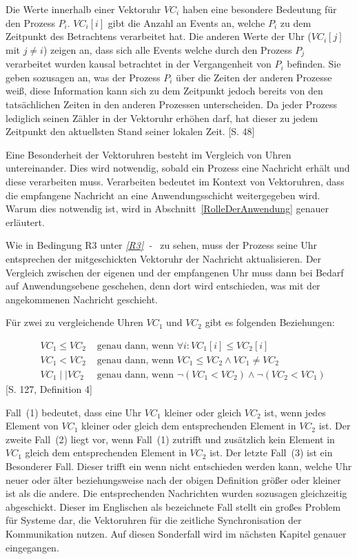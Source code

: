 Die Werte innerhalb einer Vektoruhr $VC_i$ haben eine besondere Bedeutung für den Prozess $P_i$. $VC_i[i]$ gibt die Anzahl an Events an, welche $P_i$ zu dem Zeitpunkt des Betrachtens verarbeitet hat. Die anderen Werte der Uhr ($VC_i[j]$ mit $j \neq i$) zeigen an, dass sich alle Events welche durch den Prozess $P_j$ verarbeitet wurden kausal betrachtet in der Vergangenheit von $P_i$ befinden. Sie geben sozusagen an, was der Prozess $P_i$ über die Zeiten der anderen Prozesse weiß, diese Information kann sich zu dem Zeitpunkt jedoch bereits von den tatsächlichen Zeiten in den anderen Prozessen unterscheiden. Da jeder Prozess lediglich seinen Zähler in der Vektoruhr erhöhen darf, hat dieser zu jedem Zeitpunkt den aktuellsten Stand seiner lokalen Zeit. \cite{singhal1992efficient}[S. 48]

Eine Besonderheit der Vektoruhren besteht im Vergleich von Uhren untereinander. Dies wird notwendig, sobald ein Prozess eine Nachricht erhält und diese verarbeiten muss. Verarbeiten bedeutet im Kontext von Vektoruhren, dass die empfangene Nachricht an eine Anwendungsschicht weitergegeben wird. Warum dies notwendig ist, wird in Abschnitt~\ref{RolleDerAnwendung} genauer erläutert.

Wie in Bedingung R3 unter \textit{\ref{R3}~-~} zu sehen, muss der Prozess seine Uhr entsprechen der mitgeschickten Vektoruhr der Nachricht aktualisieren. Der Vergleich zwischen der eigenen und der empfangenen Uhr muss dann bei Bedarf auf Anwendungsebene geschehen, denn dort wird entschieden, was mit der angekommenen Nachricht geschieht.

Für zwei zu vergleichende Uhren $VC_1$ und $VC_2$ gibt es folgenden Beziehungen:

\begin{eqnarray}
&VC_1 \leq VC_2& \text{ genau dann, wenn } \forall i : VC_1[i] \leq VC_2[i] \\
	&VC_1 < VC_2& \text{ genau dann, wenn } VC_1 \leq VC_2 \wedge VC_1 \neq VC_2 \\
	&VC_1 \mid \mid VC_2& \text{ genau dann, wenn } \neg(VC_1 < VC_2) \wedge \neg(VC_2 < VC_1)
\end{eqnarray}
\cite{mattern1989virtual}[S. 127, Definition 4]

Fall~(1) bedeutet, dass eine Uhr $VC_1$ kleiner oder gleich $VC_2$ ist, wenn jedes Element von $VC_1$ kleiner oder gleich dem entsprechenden Element in $VC_2$ ist. Der zweite Fall~(2) liegt vor, wenn Fall~(1) zutrifft und zusätzlich kein Element in $VC_1$ gleich dem entsprechenden Element in $VC_2$ ist. 
Der letzte Fall~(3) ist ein Besonderer Fall. Dieser trifft ein wenn nicht entschieden werden kann, welche Uhr neuer oder älter beziehungsweise nach der obigen Definition größer oder kleiner ist als die andere. Die entsprechenden Nachrichten wurden sozusagen gleichzeitig abgeschickt. Dieser im Englischen als  bezeichnete Fall stellt ein großes Problem für Systeme dar, die Vektoruhren für die zeitliche Synchronisation der Kommunikation nutzen. Auf diesen Sonderfall wird im nächsten Kapitel genauer eingegangen.

